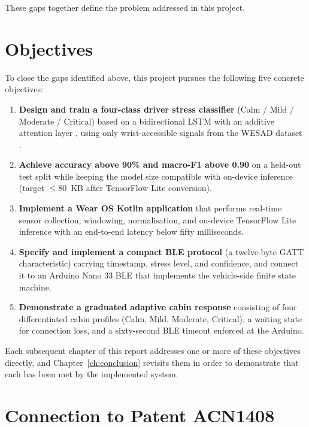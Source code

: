 These gaps together define the problem addressed in this project.

\section{Objectives}
\label{sec:objectives}

To close the gaps identified above, this project pursues the
following five concrete objectives:

\begin{enumerate}
  \item \textbf{Design and train a four-class driver stress classifier}
  (Calm / Mild / Moderate / Critical) based on a bidirectional LSTM
  \citep{graves2005bilstm} with an additive attention layer
  \citep{vaswani2017attention}, using only wrist-accessible signals
  from the WESAD dataset \citep{schmidt2018wesad}.

  \item \textbf{Achieve accuracy above 90\% and macro-F1 above 0.90}
  on a held-out test split while keeping the model size compatible
  with on-device inference (target $\le 80$~KB after TensorFlow Lite
  conversion).

  \item \textbf{Implement a Wear OS Kotlin application} that performs
  real-time sensor collection, windowing, normalisation, and on-device
  TensorFlow Lite inference \citep{tflite2023} with an end-to-end
  latency below fifty milliseconds.

  \item \textbf{Specify and implement a compact BLE protocol}
  (a twelve-byte GATT characteristic) carrying timestamp, stress level,
  and confidence, and connect it to an Arduino Nano 33 BLE that
  implements the vehicle-side finite state machine.

  \item \textbf{Demonstrate a graduated adaptive cabin response}
  consisting of four differentiated cabin profiles (Calm, Mild,
  Moderate, Critical), a waiting state for connection loss, and a
  sixty-second BLE timeout enforced at the Arduino.
\end{enumerate}

Each subsequent chapter of this report addresses one or more of
these objectives directly, and Chapter~\ref{ch:conclusion} revisits
them in order to demonstrate that each has been met by the
implemented system.

\section{Connection to Patent ACN1408}
\label{sec:acn1408}

